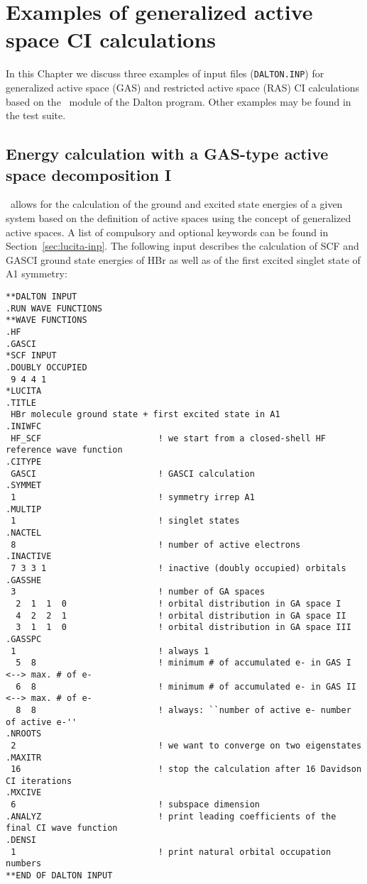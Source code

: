 \chapter{Examples of generalized active space CI calculations}
\label{ch:lucitaexamples}

In this Chapter we discuss three examples of input files (\verb|DALTON.INP|) 
for generalized active space (GAS) and restricted active space (RAS) 
CI calculations based on the \lucita\ module of the Dalton program. 
Other examples may be found in the test suite. 

\section{Energy calculation with a GAS-type active space decomposition I}\label{cc:lucitaex:gas1}
%
\lucita\  allows for the calculation of the ground and excited state energies
of a given system based on the definition of active spaces using the concept of generalized active spaces. 
A list of compulsory and optional keywords can be found in Section~\ref{sec:lucita-inp}. 
The following input describes the calculation of SCF and GASCI ground state energies of HBr as well as of the 
first excited singlet state of A1 symmetry:

%
\begin{verbatim}
**DALTON INPUT
.RUN WAVE FUNCTIONS
**WAVE FUNCTIONS
.HF
.GASCI
*SCF INPUT
.DOUBLY OCCUPIED
 9 4 4 1
*LUCITA
.TITLE
 HBr molecule ground state + first excited state in A1
.INIWFC
 HF_SCF                       ! we start from a closed-shell HF reference wave function
.CITYPE
 GASCI                        ! GASCI calculation
.SYMMET
 1                            ! symmetry irrep A1
.MULTIP
 1                            ! singlet states
.NACTEL
 8                            ! number of active electrons
.INACTIVE
 7 3 3 1                      ! inactive (doubly occupied) orbitals
.GASSHE
 3                            ! number of GA spaces
  2  1  1  0                  ! orbital distribution in GA space I
  4  2  2  1                  ! orbital distribution in GA space II
  3  1  1  0                  ! orbital distribution in GA space III
.GASSPC
 1                            ! always 1
  5  8                        ! minimum # of accumulated e- in GAS I   <--> max. # of e-
  6  8                        ! minimum # of accumulated e- in GAS II  <--> max. # of e-
  8  8                        ! always: ``number of active e- number of active e-''
.NROOTS
 2                            ! we want to converge on two eigenstates
.MAXITR
 16                           ! stop the calculation after 16 Davidson CI iterations
.MXCIVE
 6                            ! subspace dimension
.ANALYZ                       ! print leading coefficients of the final CI wave function
.DENSI
 1                            ! print natural orbital occupation numbers
**END OF DALTON INPUT
\end{verbatim}

